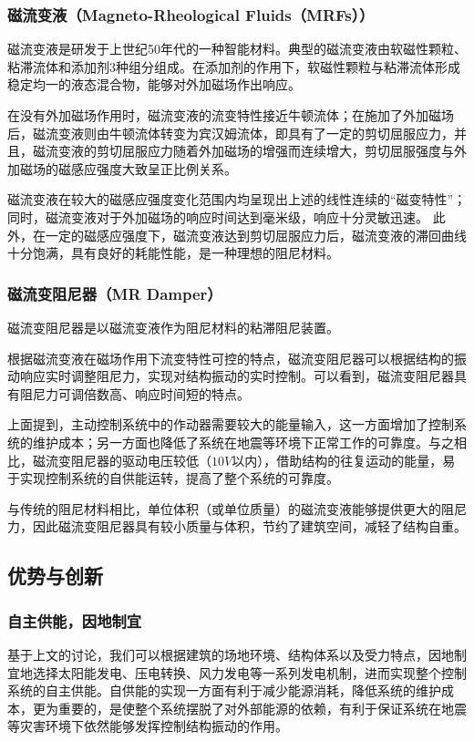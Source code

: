 \subsubsection{磁流变液（Magneto-Rheological Fluids（MRFs））}
磁流变液是研发于上世纪50年代的一种智能材料。典型的磁流变液由软磁性颗粒、粘滞流体和添加剂3种组分组成。在添加剂的作用下，软磁性颗粒与粘滞流体形成稳定均一的液态混合物，能够对外加磁场作出响应。

在没有外加磁场作用时，磁流变液的流变特性接近牛顿流体；在施加了外加磁场后，磁流变液则由牛顿流体转变为宾汉姆流体，即具有了一定的剪切屈服应力，并且，磁流变液的剪切屈服应力随着外加磁场的增强而连续增大，剪切屈服强度与外加磁场的磁感应强度大致呈正比例关系。

磁流变液在较大的磁感应强度变化范围内均呈现出上述的线性连续的“磁变特性”；同时，磁流变液对于外加磁场的响应时间达到毫米级，响应十分灵敏迅速\cite{Ali2015}。
此外，在一定的磁感应强度下，磁流变液达到剪切屈服应力后，磁流变液的滞回曲线十分饱满，具有良好的耗能性能，是一种理想的阻尼材料。

\subsubsection{磁流变阻尼器（MR Damper）}
磁流变阻尼器是以磁流变液作为阻尼材料的粘滞阻尼装置。

根据磁流变液在磁场作用下流变特性可控的特点，磁流变阻尼器可以根据结构的振动响应实时调整阻尼力，实现对结构振动的实时控制。可以看到，磁流变阻尼器具有阻尼力可调倍数高、响应时间短的特点\cite{Zhang2010}。

上面提到，主动控制系统中的作动器需要较大的能量输入，这一方面增加了控制系统的维护成本；另一方面也降低了系统在地震等环境下正常工作的可靠度。与之相比，磁流变阻尼器的驱动电压较低（$10V$以内），借助结构的往复运动的能量，易于实现控制系统的自供能运转，提高了整个系统的可靠度。

与传统的阻尼材料相比，单位体积（或单位质量）的磁流变液能够提供更大的阻尼力，因此磁流变阻尼器具有较小质量与体积，节约了建筑空间，减轻了结构自重。

\subsection{优势与创新}

\subsubsection{自主供能，因地制宜}
基于上文的讨论，我们可以根据建筑的场地环境、结构体系以及受力特点，因地制宜地选择太阳能发电、压电转换、风力发电等一系列发电机制，进而实现整个控制系统的自主供能。自供能的实现一方面有利于减少能源消耗，降低系统的维护成本，更为重要的，是使整个系统摆脱了对外部能源的依赖，有利于保证系统在地震等灾害环境下依然能够发挥控制结构振动的作用。

